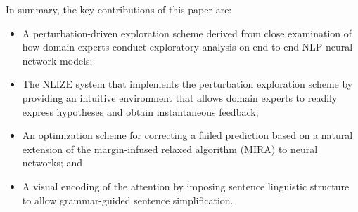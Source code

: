 In summary, the key contributions of this paper are:
\begin{itemize}
    \item A perturbation-driven exploration scheme derived from close examination of how domain experts conduct exploratory analysis on end-to-end NLP neural network models;

    \item The NLIZE system that implements the perturbation exploration scheme by providing an intuitive environment that allows domain experts to readily express hypotheses and obtain instantaneous feedback;

    \item An optimization scheme for correcting a failed prediction based on a natural extension of the margin-infused relaxed algorithm (MIRA) to neural networks; and

    \item A visual encoding of the attention by imposing sentence linguistic structure to allow grammar-guided sentence simplification.
\end{itemize}
%




